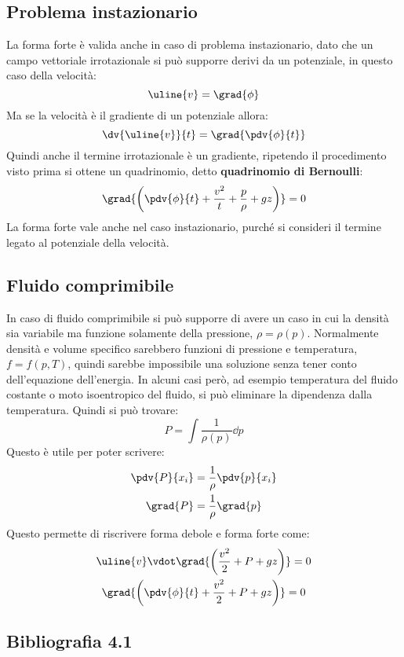 \subsection{Problema instazionario}
La forma forte è valida anche in caso di problema instazionario, dato che un campo vettoriale irrotazionale si può supporre derivi da un potenziale, in questo caso della velocità:
%
	\begin{equation*}
		\uline{v} = \grad{\phi}
	\end{equation*}
%
Ma se la velocità è il gradiente di un potenziale allora:
%
	\begin{equation*}
		\dv{\uline{v}}{t} = \grad{\pdv{\phi}{t}}
	\end{equation*}
%
Quindi anche il termine irrotazionale è un gradiente, ripetendo il procedimento visto prima si ottene un quadrinomio, detto \textbf{quadrinomio di Bernoulli}:
%
	\begin{equation*}
		\grad{\left( \pdv{\phi}{t} + \frac{v^2}{t} + \frac{p}{\rho} + gz \right)} = 0
	\end{equation*}
%
La forma forte vale anche nel caso instazionario, purché si consideri il termine legato al potenziale della velocità.

\subsection{Fluido comprimibile}
In caso di fluido comprimibile si può supporre di avere un caso in cui la densità sia variabile ma funzione solamente della pressione, $\rho = \rho(p)$.
Normalmente densità e volume specifico sarebbero funzioni di pressione e temperatura, $f = f(p, T)$, quindi sarebbe impossibile una soluzione senza tener conto dell'equazione dell'energia.
In alcuni casi però, ad esempio temperatura del fluido costante o moto isoentropico del fluido, si può eliminare la dipendenza dalla temperatura.
Quindi si può trovare:
%
	\begin{equation*}
		P = \int \frac{1}{\rho(p)} \dd{p}
	\end{equation*}
%
Questo è utile per poter scrivere:
%
	\begin{equation*}
		\begin{gathered}
			\pdv{P}{x_i} = \frac{1}{\rho} \pdv{p}{x_i}\\
			\grad{P} = \frac{1}{\rho} \grad{p}
		\end{gathered}
	\end{equation*}
%
Questo permette di riscrivere forma debole e forma forte come:
%
	\begin{equation*}
		\begin{gathered}
			\uline{v} \vdot \grad{\left( \frac{v^2}{2} + P + gz \right)} = 0\\
			 \grad{\left( \pdv{\phi}{t} + \frac{v^2}{2} + P + gz \right)} = 0
		\end{gathered}
	\end{equation*}
% 

\subsection*{Bibliografia 4.1}
\cite[Cap.\ 5.4, 5.5, 10.3, 10.4, ]{CengelCimbala}\\
\cite[Cap.\ 7.1, 7.3]{PnueliGutfinger}